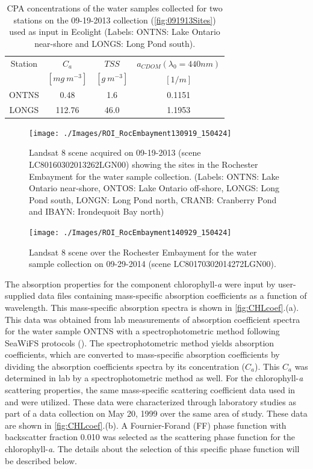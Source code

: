 \documentclass[onecolumn,3p,letterpaper]{elsarticle}
\begin{document}
\begin{table}[htbp!]
\caption{ CPA concentrations of the water samples collected for two stations on the 09-19-2013 collection (\autoref{fig:091913Sites}) used as input in Ecolight (Labels: ONTNS: Lake Ontario near-shore and LONGS: Long Pond south). \label{tab:ONTNSconc} } 
\small
\centering
\begin{tabular}{c|c|c|c} 
 Station & \bfseries{$C_a$} & \bfseries{$TSS$} & \bfseries{$a_{CDOM}(\lambda_0=440nm)$}\\
 & $[mg~m^{-3}]$ & $[g~m^{-3}]$ & $[1/m]$ \\ \hline \hline
ONTNS & 0.48   & 1.6  & 0.1151 \\ 
LONGS & 112.76 & 46.0 & 1.1953 \\ 
 \end{tabular}
\end{table}

\begin{figure}[htb]
  \centering
  \texttt{[image: ./Images/ROI\_RocEmbayment130919\_150424]}
  \caption{Landsat 8 scene acquired on 09-19-2013 (scene LC80160302013262LGN00) showing the sites in the Rochester Embayment for the water sample collection. (Labels: ONTNS: Lake Ontario near-shore, ONTOS: Lake Ontario off-shore, LONGS: Long Pond south, LONGN: Long Pond north, CRANB: Cranberry Pond and IBAYN: Irondequoit Bay north)\label{fig:091913Sites} } 
\end{figure}

\begin{figure}[htb]
  \centering
  \texttt{[image: ./Images/ROI\_RocEmbayment140929\_150424]}
  \caption{Landsat 8 scene over the Rochester Embayment for the water sample collection on 09-29-2014 (scene LC80170302014272LGN00).\label{fig:092914Sites} } 
\end{figure}

The absorption properties for the component chlorophyll-{\it a} were input by user-supplied data files containing mass-specific absorption coefficients as a function of wavelength. This mass-specific absorption spectra is shown in \autoref{fig:CHLcoef}.(a). This data was obtained from lab measurements of absorption coefficient spectra for the water sample ONTNS with a spectrophotometric method following SeaWiFS protocols (\cite{Mueller1995}). The spectrophotometric method yields absorption coefficients, which are converted to mass-specific absorption coefficients by dividing the absorption coefficients spectra by its concentration ($C_a$). This $C_a$ was determined in lab by a spectrophotometric method as well. For the chlorophyll-{\it a} scattering properties, the same mass-specific scattering coefficient data used in \cite{Raqueno:2000} and \cite{Raqueno:2003} were utilized. These data were characterized through laboratory studies as part of a data collection on May 20, 1999 over the same area of study. These data are shown in \autoref{fig:CHLcoef}.(b). A Fournier-Forand (FF) phase function with backscatter fraction 0.010 was selected as the scattering phase function for the chlorophyll-{\it a}. The details about the selection of this specific phase function will be described below.
\end{document}
